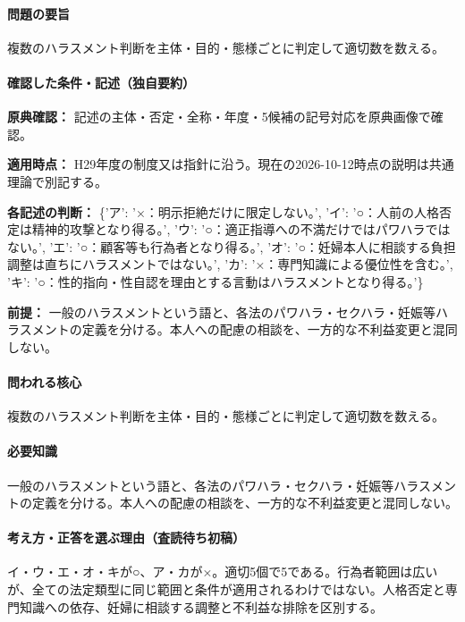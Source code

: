 \paragraph{問題の要旨} 複数のハラスメント判断を主体・目的・態様ごとに判定して適切数を数える。

\paragraph{確認した条件・記述（独自要約）}\mbox{}\par

\noindent\textbf{原典確認：} 記述の主体・否定・全称・年度・5候補の記号対応を原典画像で確認。\par

\noindent\textbf{適用時点：} H29年度の制度又は指針に沿う。現在の2026-10-12時点の説明は共通理論で別記する。\par

\noindent\textbf{各記述の判断：} \{'ア': '×：明示拒絶だけに限定しない。', 'イ': '○：人前の人格否定は精神的攻撃となり得る。', 'ウ': '○：適正指導への不満だけではパワハラではない。', 'エ': '○：顧客等も行為者となり得る。', 'オ': '○：妊婦本人に相談する負担調整は直ちにハラスメントではない。', 'カ': '×：専門知識による優位性を含む。', 'キ': '○：性的指向・性自認を理由とする言動はハラスメントとなり得る。'\}\par

\noindent\textbf{前提：} 一般のハラスメントという語と、各法のパワハラ・セクハラ・妊娠等ハラスメントの定義を分ける。本人への配慮の相談を、一方的な不利益変更と混同しない。\par

\paragraph{問われる核心} 複数のハラスメント判断を主体・目的・態様ごとに判定して適切数を数える。

\paragraph{必要知識} 一般のハラスメントという語と、各法のパワハラ・セクハラ・妊娠等ハラスメントの定義を分ける。本人への配慮の相談を、一方的な不利益変更と混同しない。

\paragraph{考え方・正答を選ぶ理由（査読待ち初稿）} イ・ウ・エ・オ・キが○、ア・カが×。適切5個で5である。行為者範囲は広いが、全ての法定類型に同じ範囲と条件が適用されるわけではない。人格否定と専門知識への依存、妊婦に相談する調整と不利益な排除を区別する。

